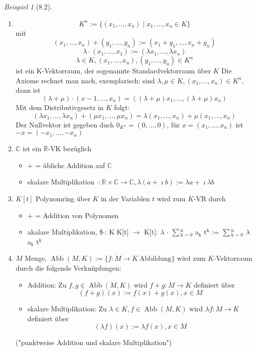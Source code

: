 \documentclass[a4paper]{scrartcl}
\DeclareMathOperator{\Abb}{Abb}
\theoremstyle{definition}
\theoremstyle{plain}
\theoremstyle{plain}
\theoremstyle{remark}
\theoremstyle{remark}
\theoremstyle{remark}
\newtheorem{ex}{Beispiel}
\newcommand{\I}{\ensuremath{\imath}}%
\begin{document}
\begin{ex}[8.2]
\mbox{}
\begin{enumerate}
\item \[K^n := \{(x_1,\ldots,x_n) \mid x_1,\ldots,x_n \in K\}\]
mit
\[(x_1,\ldots,x_n) + (y_1,\ldots,y_n) := (x_1 + y_1,\ldots,x_n + y_n)\]
\[\lambda\cdot(x_1,\ldots,x_1) := (\lambda x_1,\ldots,\lambda x_n)\]
\[\lambda \in K, (x_1,\ldots,x_n),(y_1,\ldots,y_n)\in K^n\]
ist ein K-Vektorraum, der sogenannte Standardvektorraum über $K$
Die Axiome rechnet man nach, exemplarisch: sind $\lambda,\mu\in K, (x_1,\ldots,x_n)\in K^n$, dann ist
\[(\lambda + \mu) \cdot (x-1,\ldots,x_n) = ((\lambda + \mu)x_1,\ldots,(\lambda + \mu)x_n)\]
Mit dem Distributivgesetz in $K$ folgt:
\[(\lambda x_1,\ldots,\lambda x_n) + (\mu x_1,\ldots,\mu x_n) = \lambda(x_1,\ldots,x_n) + \mu(x_1,\ldots,x_n)\]
Der Nullvektor ist gegeben duch $0_{K^n} = (0,\ldots,0)$, für $x =(x_1,\ldots,x_n)$ ist $-x = (-x_1,\ldots,-x_n)$
\item $\mathbb{C}$ ist ein $\mathbb{R}$-VK bezüglich
\begin{itemize}
\item $+$ = übliche Addition auf $\mathbb{C}$
\item skalare Multiplikation $\cdot:\mathbb{R}\times\mathbb{C} \to \mathbb{C}, \lambda (a + \I b) := \lambda a + \I \lambda b$
\end{itemize}
\item $K[t]$ Polynomring über $K$ in der Variablen $t$ wird zum $K$-VR durch
\begin{itemize}
\item $+$ = Addition von Polynomen
\item akalare Multiplikation, \$$\cdot$: K\texttimes{} K[t] $\to$ K[t]: $\lambda$ $\cdot$ $\sum$$_{\text{k = 0}}^{\text{n}}$ a$_{\text{k}}$ t$^{\text{k}}$ := $\sum$$_{\text{k = 0}}^{\text{n}}$ $\lambda$ a$_{\text{k}}$ t$^{\text{k}}$
\end{itemize}
\item $M$ Menge, $\Abb(M,K):= \{f: M \to K~\text{Abbildung}\}$ wird zum $K$-Vektorraum durch die folgende Verknüpfungen:
\begin{itemize}
\item Addition: Zu $f,g\in \Abb(M,K)$ wird $f + g: M \to K$ definiert über
\[(f + g)(x) := f(x) + g(x), x\in M\]
\item skalare Multiplikation: Zu $\lambda \in K, f\in \Abb(M,K)$ wird $\lambda f: M \to K$ definiert über
\[(\lambda f)(x) := \lambda f(x), x\in M\]
\end{itemize}
("punktweise Addition und skalare Multiplikation")
\end{enumerate}
\end{ex}
\end{document}
